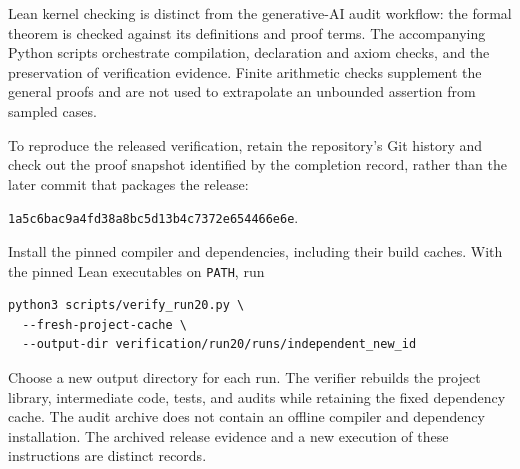 Lean kernel checking is distinct from the generative-AI audit workflow:
the formal theorem is checked against its definitions and proof terms.
The accompanying Python scripts orchestrate compilation, declaration
and axiom checks, and the preservation of verification evidence.
Finite arithmetic checks supplement the general proofs and are not
used to extrapolate an unbounded assertion from sampled cases.

To reproduce the released verification, retain the repository's Git
history and check out the proof snapshot identified by the completion
record, rather than the later commit that packages the release:
\begin{center}\small
\texttt{1a5c6bac9a4fd38a8bc5d13b4c7372e654466e6e}.
\end{center}
Install the pinned compiler and dependencies, including their build
caches. With the pinned Lean executables on \texttt{PATH}, run
\begin{small}
\begin{verbatim}
python3 scripts/verify_run20.py \
  --fresh-project-cache \
  --output-dir verification/run20/runs/independent_new_id
\end{verbatim}
\end{small}
Choose a new output directory for each run. The verifier rebuilds the
project library, intermediate code, tests, and audits while retaining
the fixed dependency cache. The audit archive does not contain an
offline compiler and dependency installation. The archived release
evidence and a new execution of these instructions are distinct records.
